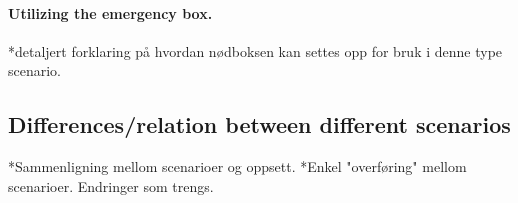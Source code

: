 \paragraph{Utilizing the emergency box.}
*detaljert forklaring på hvordan nødboksen kan settes opp for bruk i denne type scenario. 


\subsection{Differences/relation between different scenarios}
*Sammenligning mellom scenarioer og oppsett. 
*Enkel "overføring" mellom scenarioer. Endringer som trengs. 



